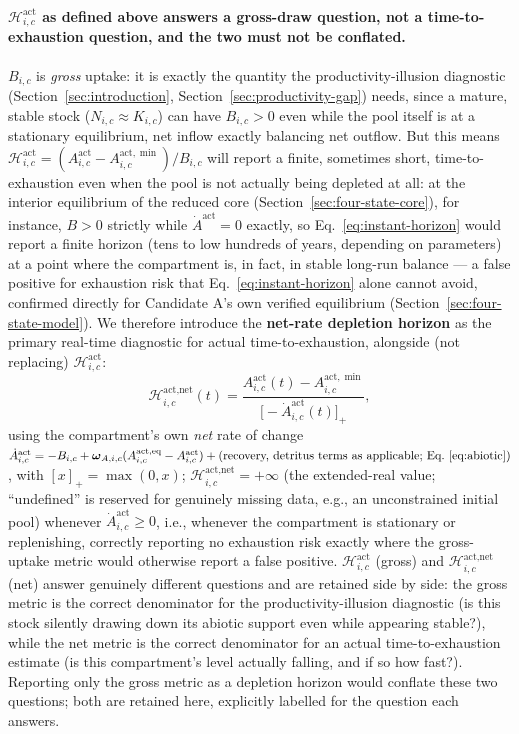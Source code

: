 \documentclass[twocolumn,10pt]{article}
\begin{document}
\paragraph{$\mathcal H^{\text{act}}_{i,c}$ as defined above answers a gross-draw question, not a time-to-exhaustion question, and the two must not be conflated.} $B_{i,c}$ is \emph{gross} uptake: it is exactly the quantity the productivity-illusion diagnostic (Section~\ref{sec:introduction}, Section~\ref{sec:productivity-gap}) needs, since a mature, stable stock ($N_{i,c}\approx K_{i,c}$) can have $B_{i,c}>0$ even while the pool itself is at a stationary equilibrium, net inflow exactly balancing net outflow. But this means $\mathcal H^{\text{act}}_{i,c}=(A^{\text{act}}_{i,c}-A^{\text{act},\min}_{i,c})/B_{i,c}$ will report a finite, sometimes short, time-to-exhaustion even when the pool is not actually being depleted at all: at the interior equilibrium of the reduced core (Section~\ref{sec:four-state-core}), for instance, $B>0$ strictly while $\dot A^{\text{act}}=0$ exactly, so Eq.~\eqref{eq:instant-horizon} would report a finite horizon (tens to low hundreds of years, depending on parameters) at a point where the compartment is, in fact, in stable long-run balance --- a false positive for exhaustion risk that Eq.~\eqref{eq:instant-horizon} alone cannot avoid, confirmed directly for Candidate A's own verified equilibrium (Section~\ref{sec:four-state-model}). We therefore introduce the \textbf{net-rate depletion horizon} as the primary real-time diagnostic for actual time-to-exhaustion, alongside (not replacing) $\mathcal H^{\text{act}}_{i,c}$:
\begin{equation}
\mathcal{H}^{\text{act,net}}_{i,c}(t) = \frac{A^{\text{act}}_{i,c}(t) - A^{\text{act},\min}_{i,c}}{\bigl[-\dot A^{\text{act}}_{i,c}(t)\bigr]_+}, \label{eq:instant-horizon-net}
\end{equation}
using the compartment's own \emph{net} rate of change $\dot A^{\text{act}}_{i,c}=-B_{i,c}+\boldsymbol\omega_{A,i,c}(A^{\text{act,eq}}_{i,c}-A^{\text{act}}_{i,c})+(\text{recovery, detritus terms as applicable; Eq.~\eqref{eq:abiotic}})$, with $[x]_+=\max(0,x)$; $\mathcal H^{\text{act,net}}_{i,c}=+\infty$ (the extended-real value; ``undefined'' is reserved for genuinely missing data, e.g., an unconstrained initial pool) whenever $\dot A^{\text{act}}_{i,c}\ge0$, i.e., whenever the compartment is stationary or replenishing, correctly reporting no exhaustion risk exactly where the gross-uptake metric would otherwise report a false positive. $\mathcal H^{\text{act}}_{i,c}$ (gross) and $\mathcal H^{\text{act,net}}_{i,c}$ (net) answer genuinely different questions and are retained side by side: the gross metric is the correct denominator for the productivity-illusion diagnostic (is this stock silently drawing down its abiotic support even while appearing stable?), while the net metric is the correct denominator for an actual time-to-exhaustion estimate (is this compartment's level actually falling, and if so how fast?). Reporting only the gross metric as a depletion horizon would conflate these two questions; both are retained here, explicitly labelled for the question each answers.
\end{document}
